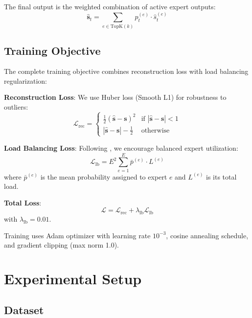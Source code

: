 \documentclass{article}
\begin{document}
The final output is the weighted combination of active expert outputs:
\begin{equation}
\hat{\mathbf{s}}_t = \sum_{e \in \text{TopK}(k)} p_t^{(e)} \cdot \hat{s}_t^{(e)}
\end{equation}

\subsection{Training Objective}

The complete training objective combines reconstruction loss with load balancing regularization:

\textbf{Reconstruction Loss}: We use Huber loss (Smooth L1) for robustness to outliers:
\begin{equation}
\mathcal{L}_{\text{rec}} = \begin{cases}
\frac{1}{2}(\hat{\mathbf{s}} - \mathbf{s})^2 & \text{if } |\hat{\mathbf{s}} - \mathbf{s}| < 1\\
|\hat{\mathbf{s}} - \mathbf{s}| - \frac{1}{2} & \text{otherwise}
\end{cases}
\end{equation}

\textbf{Load Balancing Loss}: Following \cite{fedus2022switch}, we encourage balanced expert utilization:
\begin{equation}
\mathcal{L}_{\text{lb}} = E^2 \sum_{e=1}^{E} \bar{p}^{(e)} \cdot L^{(e)}
\end{equation}
where $\bar{p}^{(e)}$ is the mean probability assigned to expert $e$ and $L^{(e)}$ is its total load.

\textbf{Total Loss}:
\begin{equation}
\mathcal{L} = \mathcal{L}_{\text{rec}} + \lambda_{\text{lb}} \mathcal{L}_{\text{lb}}
\end{equation}
with $\lambda_{\text{lb}} = 0.01$.

Training uses Adam optimizer \cite{kingma2014adam} with learning rate $10^{-3}$, cosine annealing schedule, and gradient clipping (max norm 1.0).

\section{Experimental Setup}
\label{sec:experiments}

\subsection{Dataset}
\end{document}
